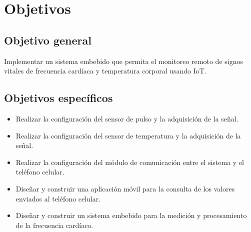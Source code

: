 \section{Objetivos}
\subsection{Objetivo general}
Implementar un sistema embebido que permita el monitoreo remoto de signos vitales de frecuencia cardíaca y temperatura corporal usando IoT.
\subsection{Objetivos específicos}
	\begin{itemize}
		\item Realizar la configuración del sensor de pulso y la adquisición de la señal.
		\item Realizar la configuración del sensor de temperatura y la adquisición de la señal.
		\item Realizar la configuración del módulo de comunicación entre el sistema y el teléfono celular.
		\item Diseñar y construir una aplicación móvil para la consulta de los valores enviados al teléfono celular.
		\item Diseñar y construir un sistema embebido para la medición y procesamiento de la frecuencia cardíaco.
	\end{itemize}	

